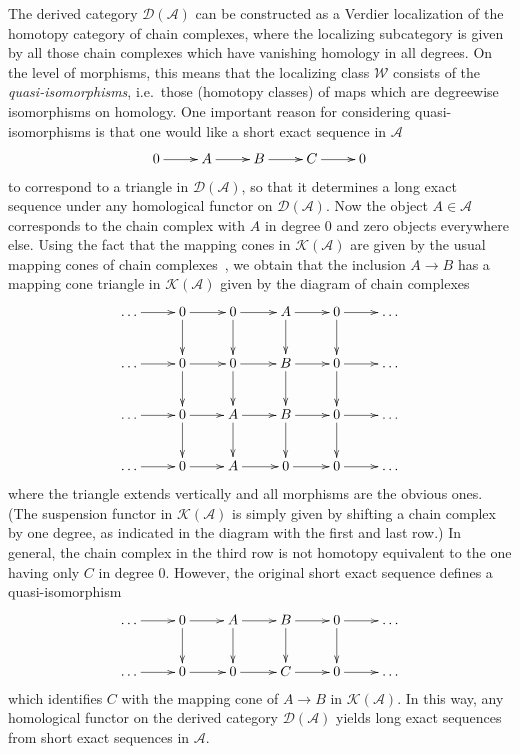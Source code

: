\documentclass{amsproc}
\theoremstyle{definition}
\begin{document}
The derived category ${\mathcal{D}}({\mathcal{A}})$ can be constructed as a Verdier localization of the homotopy category of chain complexes, where the localizing subcategory is given by all those chain complexes which have vanishing homology in all degrees. On the level of morphisms, this means that the localizing class ${\mathcal{W}}$ consists of the \emph{quasi-isomorphisms}, i.e.~those (homotopy classes) of maps which are degreewise isomorphisms on homology. One important reason for considering quasi-isomorphisms is that one would like a short exact sequence in ${\mathcal{A}}$
\[
\xymatrix{ 0 \ar[r] & A \ar[r] & B \ar[r] & C \ar[r] & 0 }
\]
to correspond to a triangle in ${\mathcal{D}}({\mathcal{A}})$, so that it determines a long exact sequence under any homological functor on ${\mathcal{D}}({\mathcal{A}})$. Now the object $A\in{\mathcal{A}}$ corresponds to the chain complex with $A$ in degree $0$ and zero objects everywhere else. Using the fact that the mapping cones in ${\mathcal{K}}({\mathcal{A}})$ are given by the usual mapping cones of chain complexes~\cite[Sec.~1.5]{Weibel}, we obtain that the inclusion $A{\longrightarrow} B$ has a mapping cone triangle in ${\mathcal{K}}({\mathcal{A}})$ given by the diagram of chain complexes
\[
\xymatrix{ \ldots \ar[r] & 0 \ar[r] \ar[d] & 0 \ar[r] \ar[d] & A \ar[r] \ar[d] & 0 \ar[r] \ar[d] & \ldots \\
	   \ldots \ar[r] & 0 \ar[r] \ar[d] & 0 \ar[r] \ar[d] & B \ar[r] \ar[d] & 0 \ar[r] \ar[d] & \ldots \\
	   \ldots \ar[r] & 0 \ar[r] \ar[d] & A \ar[r] \ar[d] & B \ar[r] \ar[d] & 0 \ar[r] \ar[d] & \ldots \\
	   \ldots \ar[r] & 0 \ar[r]        & A \ar[r]        & 0 \ar[r]        & 0 \ar[r]        & \ldots }
\]
where the triangle extends vertically and all morphisms are the obvious ones. (The suspension functor in ${\mathcal{K}}({\mathcal{A}})$ is simply given by shifting a chain complex by one degree, as indicated in the diagram with the first and last row.) In general, the chain complex in the third row is not homotopy equivalent to the one having only $C$ in degree $0$. However, the original short exact sequence defines a quasi-isomorphism
\[
\xymatrix{ \ldots \ar[r] & 0 \ar[r] \ar[d] & A \ar[r] \ar[d] & B \ar[r] \ar[d] & 0 \ar[r] \ar[d] & \ldots \\
	   \ldots \ar[r] & 0 \ar[r]        & 0 \ar[r]        & C \ar[r]        & 0 \ar[r]        & \ldots }
\]
which identifies $C$ with the mapping cone of $A{\longrightarrow} B$ in ${\mathcal{K}}({\mathcal{A}})$. In this way, any homological functor on the derived category ${\mathcal{D}}({\mathcal{A}})$ yields long exact sequences from short exact sequences in ${\mathcal{A}}$.
\end{document}
